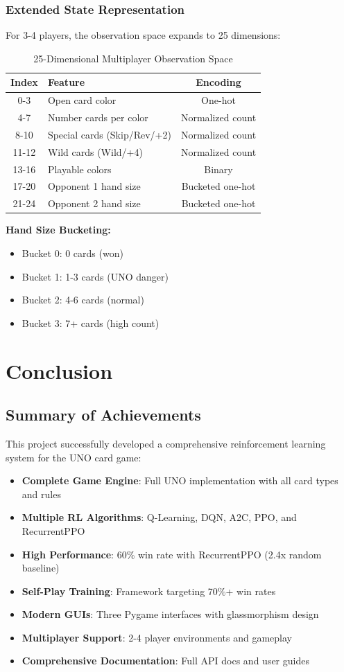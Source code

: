\documentclass[12pt,a4paper]{article}
\begin{document}
\subsubsection{Extended State Representation}
For 3-4 players, the observation space expands to 25 dimensions:
\begin{table}[H]
\centering
\begin{tabular}{clc}
\toprule
\textbf{Index} & \textbf{Feature} & \textbf{Encoding} \\
\midrule
0-3 & Open card color & One-hot \\
4-7 & Number cards per color & Normalized count \\
8-10 & Special cards (Skip/Rev/+2) & Normalized count \\
11-12 & Wild cards (Wild/+4) & Normalized count \\
13-16 & Playable colors & Binary \\
17-20 & Opponent 1 hand size & Bucketed one-hot \\
21-24 & Opponent 2 hand size & Bucketed one-hot \\
\bottomrule
\end{tabular}
\caption{25-Dimensional Multiplayer Observation Space}
\label{tab:multi_obs}
\end{table}
\textbf{Hand Size Bucketing:}
\begin{itemize}
    \item Bucket 0: 0 cards (won)
    \item Bucket 1: 1-3 cards (UNO danger)
    \item Bucket 2: 4-6 cards (normal)
    \item Bucket 3: 7+ cards (high count)
\end{itemize}
\newpage
\section{Conclusion}
\label{sec:conclusion}
\subsection{Summary of Achievements}
This project successfully developed a comprehensive reinforcement learning system for the UNO card game:
\begin{itemize}
    \item \textbf{Complete Game Engine}: Full UNO implementation with all card types and rules
    \item \textbf{Multiple RL Algorithms}: Q-Learning, DQN, A2C, PPO, and RecurrentPPO
    \item \textbf{High Performance}: 60\% win rate with RecurrentPPO (2.4x random baseline)
    \item \textbf{Self-Play Training}: Framework targeting 70\%+ win rates
    \item \textbf{Modern GUIs}: Three Pygame interfaces with glassmorphism design
    \item \textbf{Multiplayer Support}: 2-4 player environments and gameplay
    \item \textbf{Comprehensive Documentation}: Full API docs and user guides
\end{itemize}
\end{document}
